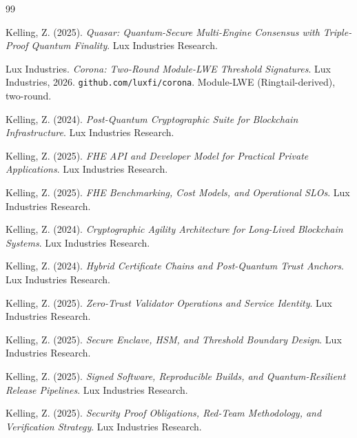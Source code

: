 \documentclass[11pt]{article}
\begin{document}
\begin{thebibliography}{99}

Kelling, Z. (2025).
\textit{Quasar: Quantum-Secure Multi-Engine Consensus with Triple-Proof Quantum Finality}.
Lux Industries Research.

{Lux Industries}.
\textit{Corona: Two-Round Module-LWE Threshold Signatures}.
Lux Industries, 2026. \texttt{github.com/luxfi/corona}.
Module-LWE (Ringtail-derived), two-round.

Kelling, Z. (2024).
\textit{Post-Quantum Cryptographic Suite for Blockchain Infrastructure}.
Lux Industries Research.

Kelling, Z. (2025).
\textit{FHE API and Developer Model for Practical Private Applications}.
Lux Industries Research.

Kelling, Z. (2025).
\textit{FHE Benchmarking, Cost Models, and Operational SLOs}.
Lux Industries Research.

Kelling, Z. (2024).
\textit{Cryptographic Agility Architecture for Long-Lived Blockchain Systems}.
Lux Industries Research.

Kelling, Z. (2024).
\textit{Hybrid Certificate Chains and Post-Quantum Trust Anchors}.
Lux Industries Research.

Kelling, Z. (2025).
\textit{Zero-Trust Validator Operations and Service Identity}.
Lux Industries Research.

Kelling, Z. (2025).
\textit{Secure Enclave, HSM, and Threshold Boundary Design}.
Lux Industries Research.

Kelling, Z. (2025).
\textit{Signed Software, Reproducible Builds, and Quantum-Resilient Release Pipelines}.
Lux Industries Research.

Kelling, Z. (2025).
\textit{Security Proof Obligations, Red-Team Methodology, and Verification Strategy}.
Lux Industries Research.

\end{thebibliography}
\end{document}
